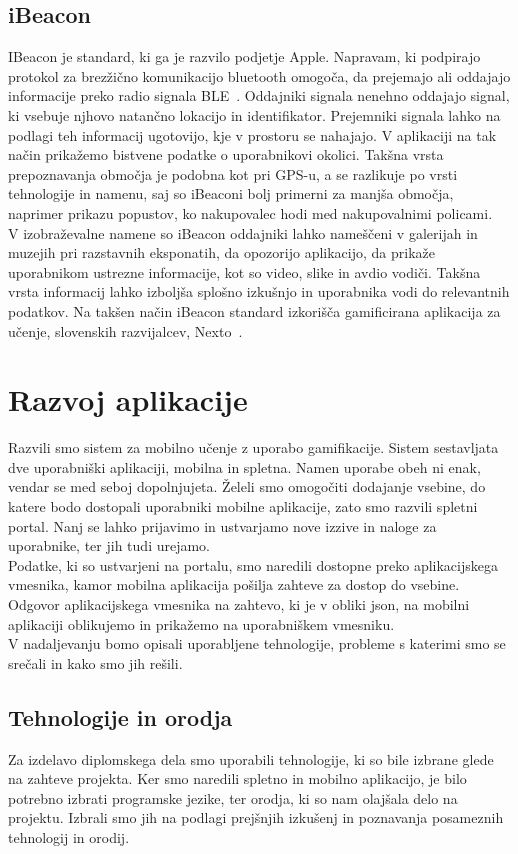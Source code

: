 \documentclass[a4paper, 12pt]{book}
\begin{document}
\section{iBeacon}
IBeacon je standard, ki ga je razvilo podjetje Apple. Napravam, ki podpirajo protokol za brezžično komunikacijo bluetooth omogoča, da prejemajo ali oddajajo informacije preko radio signala BLE~\cite{BLE}. Oddajniki signala nenehno oddajajo signal, ki vsebuje njhovo natančno lokacijo in identifikator. Prejemniki signala lahko na podlagi teh informacij ugotovijo, kje v prostoru se nahajajo. V aplikaciji na tak način prikažemo bistvene podatke o uporabnikovi okolici. Takšna vrsta prepoznavanja območja je podobna kot pri GPS-u, a se razlikuje po vrsti tehnologije in namenu, saj so iBeaconi bolj primerni za manjša območja, naprimer prikazu popustov, ko nakupovalec hodi med nakupovalnimi policami.\\
V izobraževalne namene so iBeacon oddajniki lahko nameščeni v galerijah in muzejih pri razstavnih eksponatih, da opozorijo aplikacijo, da prikaže uporabnikom ustrezne informacije, kot so video, slike in avdio vodiči. Takšna vrsta informacij lahko izboljša splošno izkušnjo in uporabnika vodi do  relevantnih podatkov. Na takšen način iBeacon standard izkorišča gamificirana aplikacija za učenje, slovenskih razvijalcev, Nexto~\cite{nexto}.

\chapter{Razvoj aplikacije}
\label{ch5}
Razvili smo sistem za mobilno učenje z uporabo gamifikacije. Sistem sestavljata dve uporabniški aplikaciji, mobilna in spletna. Namen uporabe obeh ni enak, vendar se med seboj dopolnjujeta. Želeli smo omogočiti dodajanje vsebine, do katere bodo dostopali uporabniki mobilne aplikacije, zato smo razvili spletni portal. Nanj se lahko prijavimo in ustvarjamo nove izzive in naloge za uporabnike, ter jih tudi urejamo.\\Podatke, ki so ustvarjeni na portalu, smo naredili dostopne preko aplikacijskega vmesnika, kamor mobilna aplikacija pošilja zahteve za dostop do vsebine. Odgovor aplikacijskega vmesnika na zahtevo, ki je v obliki json, na mobilni aplikaciji oblikujemo in prikažemo na uporabniškem vmesniku.\\V nadaljevanju bomo opisali uporabljene tehnologije, probleme s katerimi smo se srečali in kako smo jih rešili.
\section{Tehnologije in orodja}
Za izdelavo diplomskega dela smo uporabili tehnologije, ki so bile izbrane glede na zahteve projekta. Ker smo naredili spletno in mobilno aplikacijo, je bilo potrebno izbrati programske jezike, ter orodja, ki so nam olajšala delo na projektu. Izbrali smo jih na podlagi prejšnjih izkušenj in poznavanja posameznih tehnologij in orodij.
\end{document}
